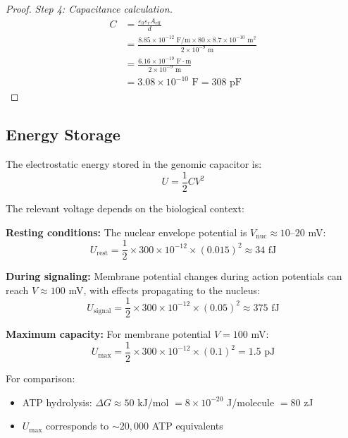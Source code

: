 \documentclass[twocolumn,10pt]{article}
\theoremstyle{remark}
\begin{document}
\begin{proof}
\textit{Step 4: Capacitance calculation.}
\begin{align}
C &= \frac{\varepsilon_0 \varepsilon_r A_{\mathrm{eff}}}{d} \\
&= \frac{8.85 \times 10^{-12} \text{ F/m} \times 80 \times 8.7 \times 10^{-10} \text{ m}^2}{2 \times 10^{-9} \text{ m}} \\
&= \frac{6.16 \times 10^{-19} \text{ F} \cdot \text{m}}{2 \times 10^{-9} \text{ m}} \\
&= 3.08 \times 10^{-10} \text{ F} = 308 \text{ pF}
\end{align}
\end{proof}

\subsection{Energy Storage}

The electrostatic energy stored in the genomic capacitor is:
\begin{equation}
U = \frac{1}{2}CV^2
\end{equation}

The relevant voltage depends on the biological context:

\textbf{Resting conditions:} The nuclear envelope potential is $V_{\mathrm{nuc}} \approx 10$--$20$ mV:
\begin{equation}
U_{\mathrm{rest}} = \frac{1}{2} \times 300 \times 10^{-12} \times (0.015)^2 \approx 34 \text{ fJ}
\end{equation}

\textbf{During signaling:} Membrane potential changes during action potentials can reach $V \approx 100$ mV, with effects propagating to the nucleus:
\begin{equation}
U_{\mathrm{signal}} = \frac{1}{2} \times 300 \times 10^{-12} \times (0.05)^2 \approx 375 \text{ fJ}
\end{equation}

\textbf{Maximum capacity:} For membrane potential $V = 100$ mV:
\begin{equation}
U_{\mathrm{max}} = \frac{1}{2} \times 300 \times 10^{-12} \times (0.1)^2 = 1.5 \text{ pJ}
\end{equation}

For comparison:
\begin{itemize}
\item ATP hydrolysis: $\Delta G \approx 50$ kJ/mol $= 8 \times 10^{-20}$ J/molecule $= 80$ zJ
\item $U_{\mathrm{max}}$ corresponds to $\sim 20,000$ ATP equivalents
\end{itemize}
\end{document}
